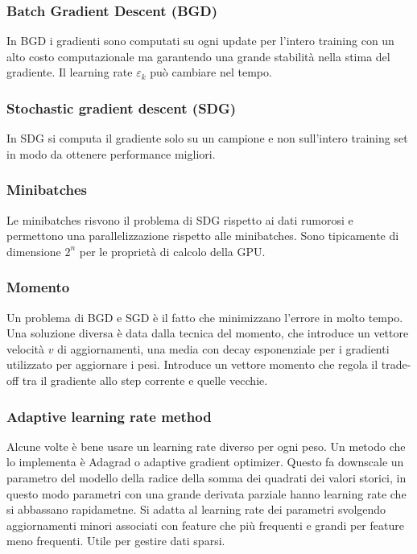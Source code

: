 		\subsubsection{Batch Gradient Descent (BGD)}
		In BGD i gradienti sono computati su ogni update per l'intero training con un alto costo computazionale ma garantendo una grande stabilit\`a nella stima del gradiente.
		Il learning rate $\varepsilon_k$ pu\`o cambiare nel tempo.
		

		\subsubsection{Stochastic gradient descent (SDG)}
		In SDG si computa il gradiente solo su un campione e non sull'intero training set in modo da ottenere performance migliori.
		

		\subsubsection{Minibatches}
		Le minibatches risvono il problema di SDG rispetto ai dati rumorosi e permettono una parallelizzazione rispetto alle minibatches.
		Sono tipicamente di dimensione $2^n$ per le propriet\`a di calcolo della GPU.

		\subsubsection{Momento}
		Un problema di BGD e SGD \`e il fatto che minimizzano l'errore in molto tempo.
		Una soluzione diversa \`e data dalla tecnica del momento, che introduce un vettore velocit\`a $v$ di aggiornamenti, una media con decay esponenziale per i gradienti utilizzato per aggiornare i pesi.
		Introduce un vettore momento che regola il trade-off tra il gradiente allo step corrente e quelle vecchie.
		

		\subsubsection{Adaptive learning rate method}
		Alcune volte \`e bene usare un learning rate diverso per ogni peso.
		Un metodo che lo implementa \`e Adagrad o adaptive gradient optimizer.
		Questo fa downscale un parametro del modello della radice della somma dei quadrati dei valori storici, in questo modo parametri con una grande derivata parziale hanno learning rate che si abbassano rapidametne.
		Si adatta al learning rate dei parametri svolgendo aggiornamenti minori associati con feature che pi\`u frequenti e grandi per feature meno frequenti.
		Utile per gestire dati sparsi.
		
